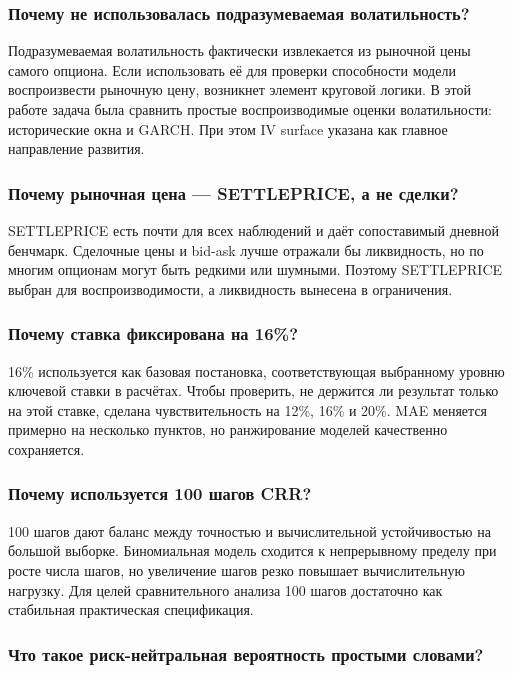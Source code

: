 \documentclass[11pt,a4paper]{article}
\begin{document}
\subsubsection{Почему не использовалась подразумеваемая волатильность?}

Подразумеваемая волатильность фактически извлекается из рыночной цены самого опциона. Если использовать её для проверки способности модели воспроизвести рыночную цену, возникнет элемент круговой логики. В этой работе задача была сравнить простые воспроизводимые оценки волатильности: исторические окна и GARCH. При этом IV surface указана как главное направление развития.

\subsubsection{Почему рыночная цена --- SETTLEPRICE, а не сделки?}

SETTLEPRICE есть почти для всех наблюдений и даёт сопоставимый дневной бенчмарк. Сделочные цены и bid-ask лучше отражали бы ликвидность, но по многим опционам могут быть редкими или шумными. Поэтому SETTLEPRICE выбран для воспроизводимости, а ликвидность вынесена в ограничения.

\subsubsection{Почему ставка фиксирована на 16\%?}

16\% используется как базовая постановка, соответствующая выбранному уровню ключевой ставки в расчётах. Чтобы проверить, не держится ли результат только на этой ставке, сделана чувствительность на 12\%, 16\% и 20\%. MAE меняется примерно на несколько пунктов, но ранжирование моделей качественно сохраняется.

\subsubsection{Почему используется 100 шагов CRR?}

100 шагов дают баланс между точностью и вычислительной устойчивостью на большой выборке. Биномиальная модель сходится к непрерывному пределу при росте числа шагов, но увеличение шагов резко повышает вычислительную нагрузку. Для целей сравнительного анализа 100 шагов достаточно как стабильная практическая спецификация.

\subsubsection{Что такое риск-нейтральная вероятность простыми словами?}
\end{document}
